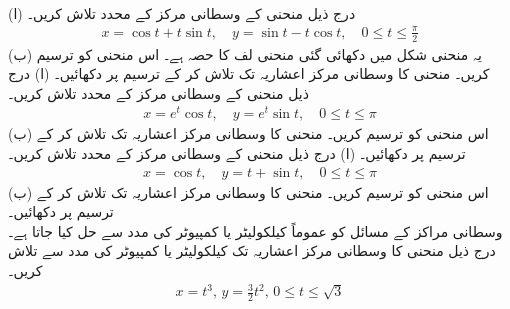 \\
(ا) درج ذیل منحنی کے وسطانی مرکز کے محدد تلاش کریں۔
\begin{align*}
x=\cos t+t\sin t,\quad y=\sin t-t\cos t,\quad 0\le t\le\frac{\pi}{2}
\end{align*}
(ب) یہ منحنی شکل  میں دکھائی گئی منحنی لف کا حصہ ہے۔ اس منحنی کو  ترسیم کریں۔ منحنی کا وسطانی مرکز  اعشاریہ تک تلاش کر کے ترسیم  پر دکھائیں۔
(ا) درج ذیل منحنی کے وسطانی مرکز کے محدد تلاش کریں۔
\begin{align*}
x=e^t\cos t,\quad y=e^t\sin t,\quad 0\le t\le\pi
\end{align*}
(ب) اس منحنی کو  ترسیم کریں۔ منحنی کا وسطانی مرکز   اعشاریہ تک تلاش کر کے ترسیم  پر دکھائیں۔
(ا) درج ذیل منحنی کے وسطانی مرکز کے محدد تلاش کریں۔
\begin{align*}
x=\cos t,\quad y=t+\sin t,\quad 0\le t\le\pi
\end{align*}
(ب) اس منحنی کو  ترسیم کریں۔ منحنی کا وسطانی مرکز   اعشاریہ تک تلاش کر کے ترسیم  پر دکھائیں۔
\\
وسطانی مراکز کے مسائل کو عموماً کیلکولیٹر یا کمپیوٹر کی مدد سے حل کیا جاتا ہے۔درج ذیل منحنی کا وسطانی مرکز  اعشاریہ تک کیلکولیٹر یا کمپیوٹر کی مدد سے تلاش کریں۔
\begin{align*}
x=t^3,\, y=\tfrac{3}{2}t^2,\, 0\le t\le \sqrt{3}
\end{align*}

